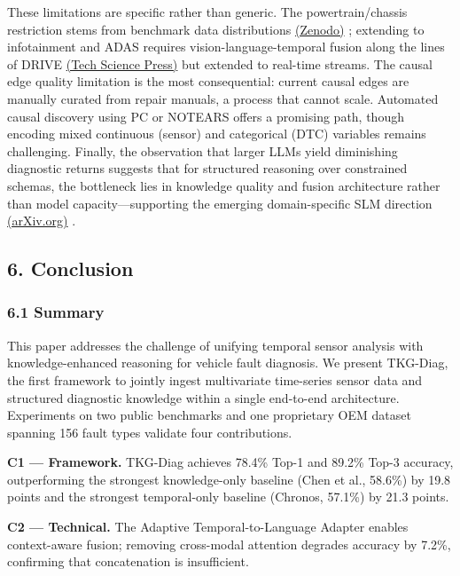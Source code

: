 \documentclass[
  11pt,
]{article}
\begin{document}
These limitations are specific rather than generic. The
powertrain/chassis restriction stems from benchmark data distributions
\href{https://zenodo.org/records/15626055}{(Zenodo)} ; extending to
infotainment and ADAS requires vision-language-temporal fusion along the
lines of DRIVE
\href{https://www.techscience.com/CMES/online/detail/26431}{(Tech
Science Press)} but extended to real-time streams. The causal edge
quality limitation is the most consequential: current causal edges are
manually curated from repair manuals, a process that cannot scale.
Automated causal discovery using PC or NOTEARS offers a promising path,
though encoding mixed continuous (sensor) and categorical (DTC)
variables remains challenging. Finally, the observation that larger LLMs
yield diminishing diagnostic returns suggests that for structured
reasoning over constrained schemas, the bottleneck lies in knowledge
quality and fusion architecture rather than model capacity---supporting
the emerging domain-specific SLM direction
\href{https://arxiv.org/html/2501.02342v1}{(arXiv.org)} .

\newpage

\subsection{6. Conclusion}\label{conclusion}

\subsubsection{6.1 Summary}\label{summary}

This paper addresses the challenge of unifying temporal sensor analysis
with knowledge-enhanced reasoning for vehicle fault diagnosis. We
present TKG-Diag, the first framework to jointly ingest multivariate
time-series sensor data and structured diagnostic knowledge within a
single end-to-end architecture. Experiments on two public benchmarks and
one proprietary OEM dataset spanning 156 fault types validate four
contributions.

\textbf{C1 --- Framework.} TKG-Diag achieves 78.4\% Top-1 and 89.2\%
Top-3 accuracy, outperforming the strongest knowledge-only baseline
(Chen et al., 58.6\%) by 19.8 points and the strongest temporal-only
baseline (Chronos, 57.1\%) by 21.3 points.

\textbf{C2 --- Technical.} The Adaptive Temporal-to-Language Adapter
enables context-aware fusion; removing cross-modal attention degrades
accuracy by 7.2\%, confirming that concatenation is insufficient.
\end{document}
